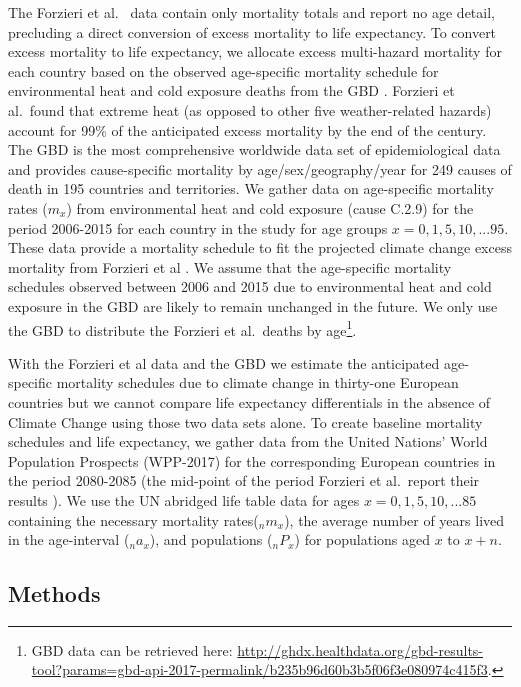 \documentclass[12pt]{article}
\begin{document}
The Forzieri et al.~\citeyearpar{forzieri2017increasing} data contain
only mortality totals and report no age detail, precluding a direct
conversion of excess mortality to life expectancy. To convert excess
mortality to life expectancy, we allocate excess multi-hazard mortality
for each country based on the observed age-specific mortality schedule
for environmental heat and cold exposure deaths from the GBD
\citep{GBD, wang2012age}. Forzieri et al.~found that extreme heat (as
opposed to other five weather-related hazards) account for 99\% of the
anticipated excess mortality by the end of the century. The GBD is the
most comprehensive worldwide data set of epidemiological data and
provides cause-specific mortality by age/sex/geography/year for 249
causes of death in 195 countries and territories. We gather data on
age-specific mortality rates (\(m_x\)) from environmental heat and cold
exposure (cause C.2.9) for the period 2006-2015 for each country in the
study for age groups \(x=0,1,5,10,...95\). These data provide a
mortality schedule to fit the projected climate change excess mortality
from Forzieri et al \citep{forzieri2017increasing}. We assume that the
age-specific mortality schedules observed between 2006 and 2015 due to
environmental heat and cold exposure in the GBD are likely to remain
unchanged in the future. We only use the GBD to distribute the Forzieri
et al.~deaths by age\footnote{GBD data can be retrieved here:
  \url{http://ghdx.healthdata.org/gbd-results-tool?params=gbd-api-2017-permalink/b235b96d60b3b5f06f3e080974c415f3}.}.

With the Forzieri et al data and the GBD we estimate the anticipated
age-specific mortality schedules due to climate change in thirty-one
European countries but we cannot compare life expectancy differentials
in the absence of Climate Change using those two data sets alone. To
create baseline mortality schedules and life expectancy, we gather data
from the United Nations' World Population Prospects (WPP-2017)
\citep{united2017world} for the corresponding European countries in the
period 2080-2085 (the mid-point of the period Forzieri et al.~report
their results \citeyearpar{forzieri2017increasing}). We use the UN
abridged life table data for ages \(x=0,1,5,10,...85\) containing the
necessary mortality rates(\(_nm_x\)), the average number of years lived
in the age-interval (\(_na_x\)), and populations (\(_nP_x\)) for
populations aged \(x\) to \(x+n\).

\hypertarget{methods}{%
\subsection{Methods}\label{methods}}
\end{document}

